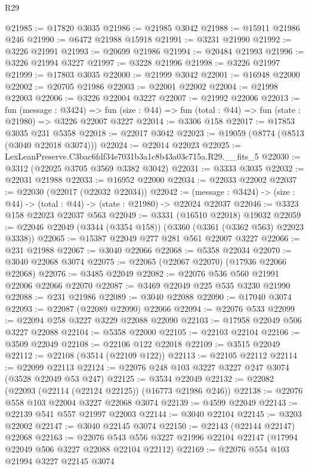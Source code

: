 \begin{lexlean}{R29}
\begin{coremodule}
@21985 := @17820 @3035
@21986 := @21985 @3042
@21988 := @15911 @21986 @246
@21990 := @6472 @21988 @15918
@21991 := @3231 @21990
@21992 := @3226 @21991
@21993 := @20699 @21986
@21994 := @20484 @21993
@21996 := @3226 @21994 @3227
@21997 := @3228 @21996
@21998 := @3226 @21997
@21999 := @17803 @3035
@22000 := @21999 @3042
@22001 := @16948 @22000
@22002 := @20705 @21986
@22003 := @22001 @22002
@22004 := @21998 @22003
@22006 := @3226 @22004 @3227
@22007 := @21992 @22006
@22013 := fun (message : @3424) =>
  fun (size : @44) => fun (total : @44) => fun (state : @21980) => @3226 @22007 @3227
@22014 := @3306 @158
@22017 := @17853 @3035 @231 @5358
@22018 := @22017 @3042
@22023 := @19059 (@8774 (@8513 (@3040 @22018 @3074)))
@22024 := @22014 @22023
@22025 := LexLeanPreserve.C3bac6fdf34e7031b3a1c8b43a03c715a.R29.__fits_5
@22030 := @3312 (@22025 @3705 @3569 @3382 @3042)
@22031 := @3333 @3035
@22032 := @22031 @21988
@22033 := @16952 @22000
@22034 := @22033 @22002
@22037 := @22030 (@22017 (@22032 @22034))
@22042 := (message : @3424) -> (size : @44) -> (total : @44) -> (state : @21980) -> @22024 @22037
@22046 := @3323 @158 @22023 @22037 @563
@22049 := @3331 (@16510 @22018) @19032
@22059 := @22046 @22049 (@3344 (@3354 @158)) (@3360 (@3361 (@3362 @563) @22023 @3338))
@22065 := @15387 @22049 @277 @281 @561 @22007 @3227
@22066 := @231 @21988
@22067 := @3040 @22066
@22068 := @5358 @22034
@22070 := @3040 @22068 @3074
@22075 := @22065 (@22067 @22070) (@17936 @22066 @22068)
@22076 := @3485 @22049
@22082 := @22076 @536 @560 @21991 @22006 @22066 @22070
@22087 := @3469 @22049 @225 @535 @3230 @21990
@22088 := @231 @21986
@22089 := @3040 @22088
@22090 := @17040 @3074
@22093 := @22087 (@22089 @22090) @22066
@22094 := @22076 @533
@22099 := @22094 @258 @3227 @3229 @22088 @22090
@22103 := @17958 @22049 @506 @3227 @22088
@22104 := @5358 @22000
@22105 := @22103 @22104
@22106 := @3509 @22049
@22108 := @22106 @122 @22018
@22109 := @3515 @22049
@22112 := @22108 (@3514 (@22109 @122))
@22113 := @22105 @22112
@22114 := @22099 @22113
@22124 := @22076 @248 @103 @3227 @3227 @247 @3074 (@3528 @22049 @53 @247)
@22125 := @3534 @22049
@22132 := @22082 (@22093 (@22114 (@22124 @22125)) (@16773 @21986 @246))
@22138 := @22076 @558 @103 @22004 @3227 @22068 @3074
@22139 := @4599 @22049
@22143 := @22139 @541 @557 @21997 @22003
@22144 := @3040 @22104
@22145 := @3203 @22002
@22147 := @3040 @22145 @3074
@22150 := @22143 (@22144 @22147) @22068
@22163 := @22076
    @543
    @556
    @3227
    @21996
    @22104
    @22147
    (@17994 @22049 @506 @3227 @22088 @22104 @22112)
@22169 := @22076 @554 @103 @21994 @3227 @22145 @3074

\end{coremodule}
\end{lexlean}
